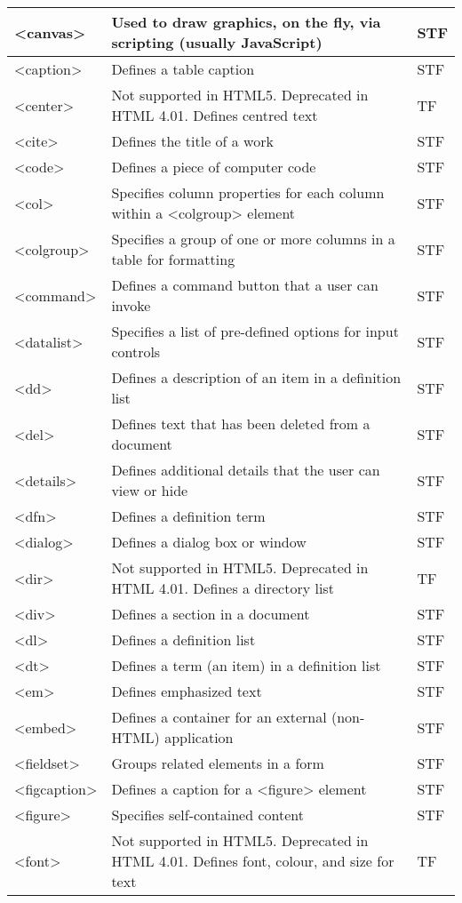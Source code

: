 \begin{longtable}{|p{60pt}|p{320pt}|p{40pt}|}
\hline
<canvas>		&	Used to draw graphics, on the fly, via scripting (usually JavaScript) & STF\\
\hline
<caption>		&	Defines a table caption & STF\\
\hline
<center>		&	Not supported in HTML5. Deprecated in HTML 4.01. Defines centred text & TF\\
\hline
<cite>		&	Defines the title of a work & STF\\
\hline
<code>		&	Defines a piece of computer code & STF\\
\hline
<col>		&	Specifies column properties for each column within a <colgroup> element  & STF\\
\hline
<colgroup>	&	Specifies a group of one or more columns in a table for formatting	& STF\\
\hline
<command>	&	Defines a command button that a user can invoke	& STF\\
\hline
<datalist>	&	Specifies a list of pre-defined options for input controls & STF\\
\hline
<dd>		&	Defines a description of an item in a definition list & STF\\
\hline
<del>		&	Defines text that has been deleted from a document & STF\\
\hline
<details>		&	Defines additional details that the user can view or hide & STF\\
\hline
<dfn>		&	Defines a definition term & STF\\
\hline
<dialog>		&	Defines a dialog box or window & STF\\
\hline
<dir>		&	Not supported in HTML5. Deprecated in HTML 4.01. Defines a directory list & TF\\
\hline
<div>		&	Defines a section in a document	& STF\\
\hline
<dl>			&	Defines a definition list & STF\\
\hline
<dt>			&	Defines a term (an item) in a definition list & STF\\
\hline
<em>		&	Defines emphasized text & STF\\
\hline
<embed>		&	Defines a container for an external (non-HTML) application & STF\\
\hline
<fieldset>	&	Groups related elements in a form	& STF\\
\hline
<figcaption>	&	Defines a caption for a <figure> element & STF\\
\hline
<figure>		&	Specifies self-contained content & STF\\
\hline
<font>		&	Not supported in HTML5. Deprecated in HTML 4.01. Defines font, colour, and size for text & TF\\

\end{longtable}
